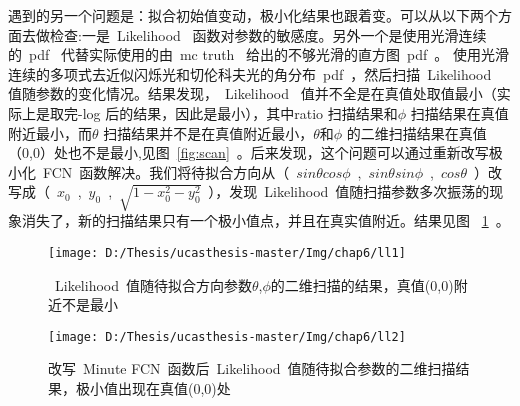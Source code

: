遇到的另一个问题是：拟合初始值变动，极小化结果也跟着变。可以从以下两个方面去做检查:一是~Likelihood~ 函数对参数的敏感度。另外一个是使用光滑连续的~pdf~ 代替实际使用的由~mc truth~ 给出的不够光滑的直方图~pdf~。 使用光滑连续的多项式去近似闪烁光和切伦科夫光的角分布~pdf~，然后扫描~Likelihood~ 值随参数的变化情况。结果发现，~Likelihood~ 值并不全是在真值处取值最小（实际上是取完-log 后的结果，因此是最小），其中ratio 扫描结果和$\phi$ 扫描结果在真值附近最小，而$\theta$ 扫描结果并不是在真值附近最小，$\theta$和$\phi$ 的二维扫描结果在真值（0,0）处也不是最小,见图~\ref{fig:scan}~。后来发现，这个问题可以通过重新改写极小化~FCN~函数解决。我们将待拟合方向从（~$sin\theta cos\phi$~,~$sin\theta sin\phi$~,~$cos\theta$~）改写成（~$ x_0$~,~$y_0$~,~$\sqrt{1-x^2_0-y^2_0}$~），发现~Likelihood~值随扫描参数多次振荡的现象消失了，新的扫描结果只有一个极小值点，并且在真实值附近。结果见图
~\ref{fig:postscan}~。
\begin{figure}[!htbp]
\begin{minipage}[t]{0.48\linewidth}
  \centering
     \texttt{[image: D:/Thesis/ucasthesis-master/Img/chap6/ll1]}
    \caption{~Likelihood~值随待拟合方向参数$\theta$,$\phi$的二维扫描的结果，真值(0,0)附近不是最小}
    \label{fig:scan}
  \end{minipage}%
  \quad\quad
  \begin{minipage}[t]{0.48\linewidth}
  \centering
    \texttt{[image: D:/Thesis/ucasthesis-master/Img/chap6/ll2]}
    \caption{改写~Minute FCN~函数后~Likelihood~值随待拟合参数的二维扫描结果，极小值出现在真值(0,0)处}
    \label{fig:postscan}
  \end{minipage}
  \end{figure}

